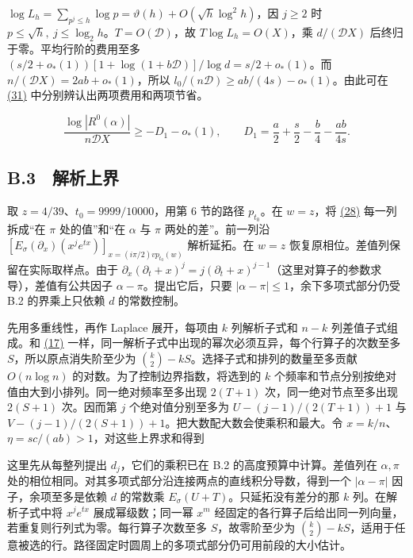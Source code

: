 \documentclass[11pt,a4paper]{article}
\begin{document}
\(\log L_h=\sum_{p^j\le h}\log p=\vartheta(h)+O(\sqrt h\log^2h)\)，因 \(j\ge2\) 时 \(p\le\sqrt h,\ j\le\log_2 h\)。\(T=O(\mathscr D)\)，故 \(T\log L_h=O(X)\)，乘 \(d/(\mathscr D X)\) 后终归于零。平均行阶的费用至多 \((s/2+o_*(1))[1+\log(1+b\mathscr D)]/\log d=s/2+o_*(1)\)。而 \(n/(\mathscr D X)=2ab+o_*(1)\)，所以 \(l_0/(n\mathscr D)\ge ab/(4s)-o_*(1)\)。由此可在 \hyperref[eq:31]{(31)} 中分别辨认出两项费用和两项节省。

\[
 \frac{\log|R^0(\alpha)|}{n\mathscr D X}\ge -D_1-o_*(1),\qquad
 D_1=\frac a2+\frac s2-\frac b4-\frac{ab}{4s}.                            \tag{31}\label{eq:31}
\]

\subsection{B.3　解析上界}\label{b.3-ux89e3ux6790ux4e0aux754c}

取 \(z=4/39\)、\(t_0=9999/10000\)，用第 6 节的路径 \(p_{t_0}\)。在 \(w=z\)，将 \hyperref[eq:28]{(28)} 每一列拆成``在 \(\pi\) 处的值''和``在 \(\alpha\) 与 \(\pi\) 两处的差''。前一列沿 \([E_\sigma(\partial_x)(x^je^{tx})]_{x=(i\pi/2)v p_{t_0}(w)}\) 解析延拓。在 \(w=z\) 恢复原相位。差值列保留在实际取样点。由于 \(\partial_x(\partial_t+x)^j=j(\partial_t+x)^{j-1}\)（这里对算子的参数求导），差值有公共因子 \(\alpha-\pi\)。提出它后，只要 \(|\alpha-\pi|\le1\)，余下多项式部分仍受 B.2 的界乘上只依赖 \(d\) 的常数控制。

先用多重线性，再作 Laplace 展开，每项由 \(k\) 列解析子式和 \(n-k\) 列差值子式组成。和 \hyperref[eq:17]{(17)} 一样，同一解析子式中出现的幂次必须互异，每个行算子的次数至多 \(S\)，所以原点消失阶至少为 \(\binom k2-kS\)。选择子式和排列的数量至多贡献 \(O(n\log n)\) 的对数。为了控制边界指数，将选到的 \(k\) 个频率和节点分别按绝对值由大到小排列。同一绝对频率至多出现 \(2(T+1)\) 次，同一绝对节点至多出现 \(2(S+1)\) 次。因而第 \(j\) 个绝对值分别至多为 \(U-(j-1)/(2(T+1))+1\) 与 \(V-(j-1)/(2(S+1))+1\)。把大数配大数会使乘积和最大。令 \(x=k/n\)、\(\eta=sc/(ab)>1\)，对这些上界求和得到

这里先从每整列提出 \(d_j\)，它们的乘积已在 B.2 的高度预算中计算。差值列在 \(\alpha,\pi\) 处的相位相同。对其多项式部分沿连接两点的直线积分导数，得到一个 \(|\alpha-\pi|\) 因子，余项至多是依赖 \(d\) 的常数乘 \(E_\sigma(U+T)\)。只延拓没有差分的那 \(k\) 列。在解析子式中将 \(x^j e^{tx}\) 展成幂级数；同一幂 \(x^m\) 经固定的各行算子后给出同一列向量，若重复则行列式为零。每行算子次数至多 \(S\)，故零阶至少为 \(\binom k2-kS\)，适用于任意被选的行。路径固定时圆周上的多项式部分仍可用前段的大小估计。
\end{document}

